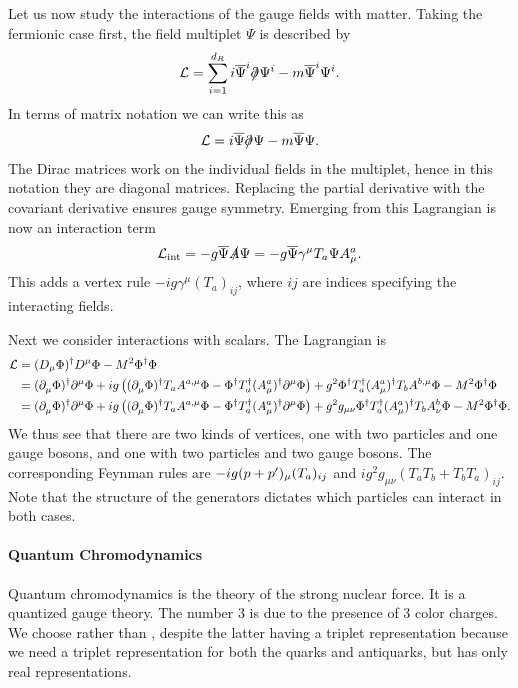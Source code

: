 Let us now study the interactions of the gauge fields with matter. Taking the fermionic case first, the field multiplet $\Psi$ is described by
\begin{align*}
	\mathcal{L} = \sum\limits_{i = 1}^{d_{R}}i\overline{\Psi}^{i}\slashed{\partial^{}_{}}\Psi^{i} - m\overline{\Psi}^{i}\Psi^{i}.
\end{align*}
In terms of matrix notation we can write this as
\begin{align*}
	\mathcal{L} = i\overline{\Psi}\slashed{\partial^{}_{}}\Psi - m\overline{\Psi}\Psi.
\end{align*}
The Dirac matrices work on the individual fields in the multiplet, hence in this notation they are diagonal matrices. Replacing the partial derivative with the covariant derivative ensures gauge symmetry. Emerging from this Lagrangian is now an interaction term
\begin{align*}
	\mathcal{L}_{\text{int}} = -g\overline{\Psi}\slashed{A}\Psi = -g\overline{\Psi}\gamma^{\mu}T_{a}\Psi A_{\mu}^{a}.
\end{align*}
This adds a vertex rule $-ig\gamma^{\mu}(T_{a})_{ij}$, where $ij$ are indices specifying the interacting fields.

Next we consider interactions with scalars. The Lagrangian is
\begin{align*}
	\mathcal{L} &= (D_{\mu}\Phi)^{\dagger} D^{\mu}\Phi - M^{2}\Phi^{\dagger}\Phi \\
	     &= (\partial^{}_{\mu}\Phi)^{\dagger} \partial^{\mu}_{}\Phi + ig\left((\partial^{}_{\mu}\Phi)^{\dagger} T_{a}A^{a, \mu}\Phi - \Phi^{\dagger} T_{a}^{\dagger} (A_{\mu}^{a})^{\dagger}\partial^{\mu}_{}\Phi\right) + g^{2}\Phi^{\dagger} T_{a}^{\dagger} (A_{\mu}^{a})^{\dagger} T_{b}A^{b, \mu}\Phi - M^{2}\Phi^{\dagger}\Phi \\
	     &= (\partial^{}_{\mu}\Phi)^{\dagger} \partial^{\mu}_{}\Phi + ig\left((\partial^{}_{\mu}\Phi)^{\dagger} T_{a}A^{a, \mu}\Phi - \Phi^{\dagger} T_{a}^{\dagger} (A_{\mu}^{a})^{\dagger}\partial^{\mu}_{}\Phi\right) + g^{2}g_{\mu\nu}\Phi^{\dagger} T_{a}^{\dagger} (A_{\mu}^{a})^{\dagger} T_{b}A_{\nu}^{b}\Phi - M^{2}\Phi^{\dagger}\Phi.
\end{align*}
We thus see that there are two kinds of vertices, one with two particles and one gauge bosons, and one with two particles and two gauge bosons. The corresponding Feynman rules are $-ig(p + p^{\prime})_{\mu}(T_{a})_{ij}$ and $ig^{2}g_{\mu\nu}(T_{a}T_{b} + T_{b}T_{a})_{ij}$. Note that the structure of the generators dictates which particles can interact in both cases.

\paragraph{Quantum Chromodynamics}
Quantum chromodynamics is the theory of the strong nuclear force. It is a quantized  gauge theory. The number 3 is due to the presence of 3 color charges. We choose  rather than , despite the latter having a triplet representation because we need a triplet representation for both the quarks and antiquarks, but  has only real representations.


